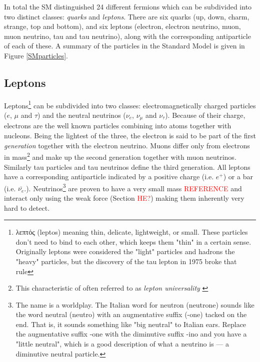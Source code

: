 In total the SM distinguished 24 different fermions which can be subdivided into two distinct classes: \textit{quarks} and \textit{leptons}. There are six quarks (up, down, charm, strange, top and bottom), and six leptons (electron, electron neutrino, muon, muon neutrino, tau and tau neutrino), along with the corresponding antiparticle of each of these.
A summary of the particles in the Standard Model is given in Figure \ref{SMparticles}.

\subsection{Leptons}
Leptons\footnote{\gr λεπτός \en (leptos) meaning thin, delicate, lightweight, or small. These particles don't need to bind to each other, which keeps them "thin" in a certain sense. Originally leptons were considered the "light" particles and hadrons the "heavy" particles, but the discovery of the tau lepton in 1975 broke that rule} can be subdivided into two classes: electromagnetically charged particles ($e$, $\mu$ and $\tau$) and the neutral neutrinos ($\nu_{e}$, $\nu_{\mu}$ and $\nu_{\tau}$). Because of their charge, electrons are the well known particles combining into atoms together with nucleons. Being the lightest of the three, the electron is said to be part of the first \textit{generation} together with the electron neutrino. Muons differ only from electrons in mass\footnote{This characteristic of often referred to as \textit{lepton universality} \cite{???}} and make up the second generation together with muon neutrinos. Similarly tau particles and tau neutrinos define the third generation. All leptons have a corresponding antiparticle indicated by a positive charge (i.e. $e^+$) or a bar (i.e. $\bar{\nu_e}$.). Neutrinos\footnote{The name is a worldplay. The Italian word for neutron (neutrone) sounds like the word neutral (neutro) with an augmentative suffix (-one) tacked on the end. That is, it sounds something like "big neutral" to Italian ears. Replace the augmentative suffix -one with the diminutive suffix -ino and you have a "little neutral", which is a good description of what a neutrino is — a diminutive neutral particle.} are proven to have a very small mass \textcolor{red}{REFERENCE} and interact only using the weak force (Section \textcolor{red}{HE?}) making them inherently very hard to detect.

